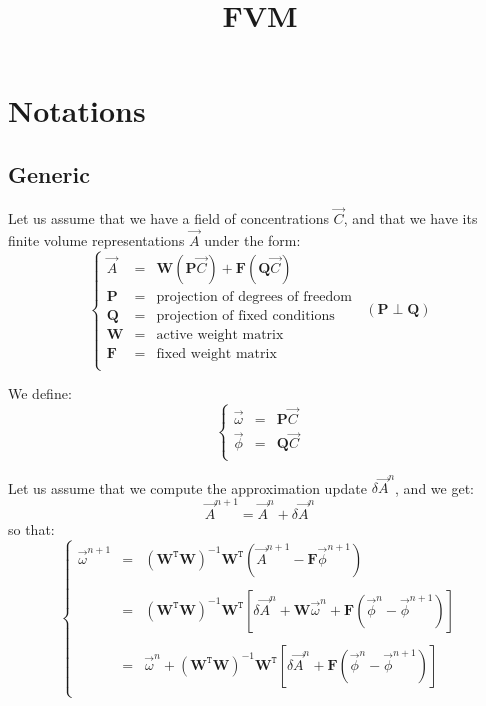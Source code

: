 \documentclass[aps,onecolumn,11pt]{revtex4}
\newcommand{\mat}[1]{{\bm{#1}}}
\newcommand{\trn}[1]{{{{#1}}^{\mathtt{T}}}}
\begin{document}
\title{FVM}
\maketitle

\section{Notations}

\subsection{Generic}

Let us assume that we have a field of concentrations $\vec{C}$,
and that we have its finite volume representations $\vec{A}$ under the form:
\begin{equation}
\left\lbrace
\begin{array}{rcl}
	\vec{A} & = & \mat{W} \left(\mat{P}\vec{C}\right) + \mat{F} \left(\mat{Q}\vec{C}\right)\\
	\mat{P} & = & \text{projection of degrees of freedom}\\
	\mat{Q} & = & \text{projection of fixed conditions}\\
	\mat{W} & = & \text{active weight matrix}\\
	\mat{F} & = & \text{fixed weight matrix}\\
\end{array}
\right.
\;\;(\mat{P} \perp \mat{Q})
\end{equation}

We define:
\begin{equation}
\left\lbrace
\begin{array}{rcl}
	\vec{\omega} & = & \mat{P}\vec{C}\\
	\vec{\phi}   & = & \mat{Q}\vec{C}\\
\end{array}
\right.
\end{equation}

Let us assume that we compute the approximation update $\delta\vec{A}^n$, and we get:
\begin{equation}
	\vec{A}^{n+1} = \vec{A}^n + \delta\vec{A}^n
\end{equation}
so that:
\begin{equation}
\left\lbrace
\begin{array}{rcl}
	\vec{\omega}^{n+1} & = & \left(\trn{\mat{W}}\mat{W}\right)^{-1} \trn{\mat{W}} \left( \vec{A}^{n+1} -   \mat{F} \vec{\phi}^{n+1}\right)\\
	\\
	& = &  \left(\trn{\mat{W}}\mat{W}\right)^{-1} \trn{\mat{W}} 
	\left[ \delta\vec{A}^{n} + \mat{W} \vec{\omega}^n + \mat{F} \left(\vec{\phi}^{n} - \vec{\phi}^{n+1}\right) \right]\\
	\\
	& = & \vec{\omega}^n + 
	\left(\trn{\mat{W}}\mat{W}\right)^{-1} \trn{\mat{W}} \left[ \delta\vec{A}^{n} + \mat{F} \left(\vec{\phi}^{n} - \vec{\phi}^{n+1}\right) \right]\\
\end{array}
\right.
\end{equation}
\end{document}
